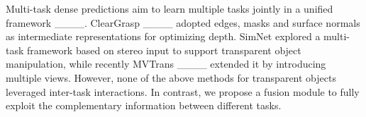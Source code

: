 Multi-task dense predictions aim to learn multiple tasks jointly in a unified framework ____. ClearGrasp ____ adopted edges, masks and surface normals as intermediate representations for optimizing depth. SimNet explored a multi-task framework based on stereo input to support transparent object manipulation, while recently MVTrans ____ extended it by introducing multiple views. However, none of the above methods for transparent objects leveraged inter-task interactions. In contrast, we propose a fusion module to fully exploit the complementary information between different tasks.





